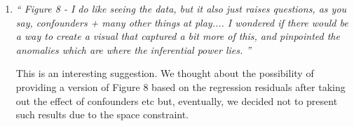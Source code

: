 \documentclass[11pt]{article}
\begin{document}
\begin{enumerate}
\item \textit{`` Figure 8 - I do like seeing the data, but it also just raises questions, as you say, confounders + many other things at play.... I wondered if there would be a way to create a visual that captured a bit more of this, and pinpointed the anomalies which are where the inferential power lies. ''}

This is an interesting suggestion. We thought about the possibility of providing a version of Figure 8 based on the regression residuals after taking out the effect of confounders etc but, eventually, we decided not to present such results due to the space constraint.  

\end{enumerate}
\end{document}
